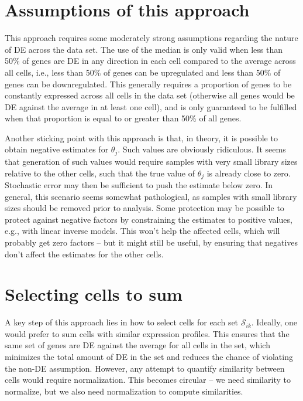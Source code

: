 \documentclass{article}
\begin{document}
\section{Assumptions of this approach}
This approach requires some moderately strong assumptions regarding the nature of DE across the data set.
The use of the median is only valid when less than 50\% of genes are DE in any direction in each cell compared to the average across all cells,
    i.e., less than 50\% of genes can be upregulated and less than 50\% of genes can be downregulated.
This generally requires a proportion of genes to be constantly expressed across all cells in the data set (otherwise all genes would be DE against the average in at least one cell),
    and is only guaranteed to be fulfilled when that proportion is equal to or greater than 50\% of all genes.

Another sticking point with this approach is that, in theory, it is possible to obtain negative estimates for $\theta_j$.
Such values are obviously ridiculous.
It seems that generation of such values would require samples with very small library sizes relative to the other cells, 
    such that the true value of $\theta_j$ is already close to zero.
Stochastic error may then be sufficient to push the estimate below zero.
In general, this scenario seems somewhat pathological, as samples with small library sizes should be removed prior to analysis.
Some protection may be possible to protect against negative factors by constraining the estimates to positive values, e.g., with linear inverse models.
This won't help the affected cells, which will probably get zero factors -- but it might still be useful, by ensuring that negatives don't affect the estimates for the other cells.

\section{Selecting cells to sum}
A key step of this approach lies in how to select cells for each set $\mathcal{S}_{ik}$.
Ideally, one would prefer to sum cells with similar expression profiles.
This ensures that the same set of genes are DE against the average for all cells in the set,
    which minimizes the total amount of DE in the set and reduces the chance of violating the non-DE assumption.
However, any attempt to quantify similarity between cells would require normalization.
This becomes circular -- we need similarity to normalize, but we also need normalization to compute similarities.
\end{document}
